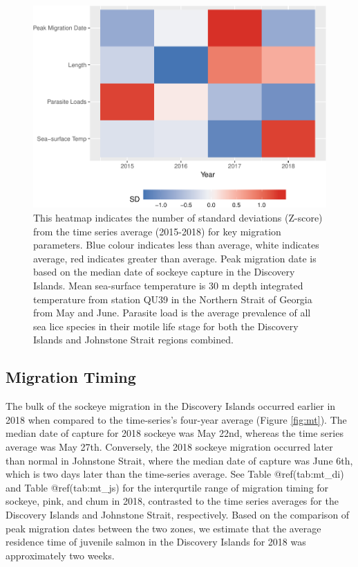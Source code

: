 \documentclass[fleqn,10pt]{wlpeerj} %
\begin{document}
\begin{figure}
\includegraphics[width=0.8\linewidth]{peer_j_migration_dynamics_files/figure-latex/heatmap-1} \caption{This heatmap indicates the number of standard deviations (Z-score) from the time series average (2015-2018) for key migration parameters. Blue colour indicates less than average, white indicates average, red indicates greater than average. Peak migration date is based on the median date of sockeye capture in the Discovery Islands.  Mean sea-surface temperature is 30 m depth integrated temperature from station QU39 in the Northern Strait of Georgia from May and June. Parasite load is the average prevalence of all sea lice species in their motile life stage for both the Discovery Islands and Johnstone Strait regions combined.}\label{fig:heatmap}
\end{figure}

\subsection*{Migration Timing}\label{migration-timing}

The bulk of the sockeye migration in the Discovery Islands occurred
earlier in 2018 when compared to the time-series's four-year average
(Figure \ref{fig:mt}). The median date of capture for 2018 sockeye was
May 22nd, whereas the time series average was May 27th. Conversely, the
2018 sockeye migration occurred later than normal in Johnstone Strait,
where the median date of capture was June 6th, which is two days later
than the time-series average. See Table @ref(tab:mt\_di) and Table
@ref(tab:mt\_js) for the interqurtile range of migration timing for
sockeye, pink, and chum in 2018, contrasted to the time series averages
for the Discovery Islands and Johnstone Strait, respectively. Based on
the comparison of peak migration dates between the two zones, we
estimate that the average residence time of juvenile salmon in the
Discovery Islands for 2018 was approximately two weeks.
\end{document}
